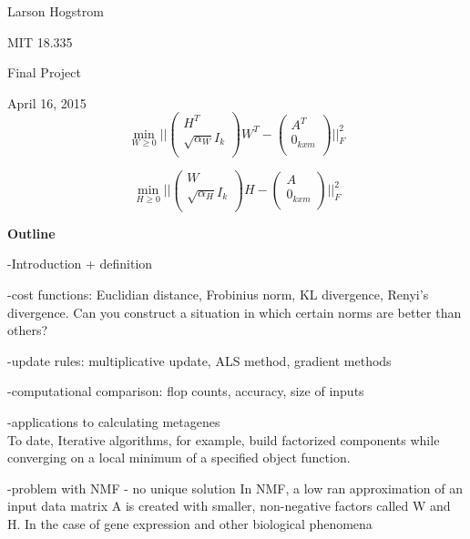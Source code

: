 \documentclass[12pt]{article}
\begin{document}
Larson Hogstrom 

MIT 18.335

Final Project

April 16, 2015 \\


\begin{equation}
    \min_{W \ge 0} || \left( \begin{array}{c} H^T   \\  \sqrt{\alpha_W}I_k \\ \end{array} \right) W^T- \left( \begin{array}{c} A^T   \\  0_{kxm} \\ \end{array} \right) ||^{2}_{F} 
\end{equation}

\begin{equation}
    \min_{H \ge 0} || \left( \begin{array}{c} W   \\  \sqrt{\alpha_H}I_k \\ \end{array} \right) H- \left( \begin{array}{c} A   \\  0_{kxm} \\ \end{array} \right) ||^{2}_{F} 
\end{equation}


\textbf{Outline}

-Introduction + definition

-cost functions: Euclidian distance, Frobinius norm, KL divergence, Renyi's divergence. Can you construct a situation in which certain norms are better than others?

-update rules: multiplicative update, ALS method, gradient methods

-computational comparison: flop counts, accuracy, size of inputs

-applications to calculating metagenes \\

To date, 
Iterative algorithms, for example, build factorized components while converging on a local minimum of a specified object function. 

-problem with NMF - no unique solution 
In NMF, a low ran approximation of an input data matrix A is created with smaller, non-negative factors called W and H. 
In the case of gene expression and other biological phenomena 
\end{document}
